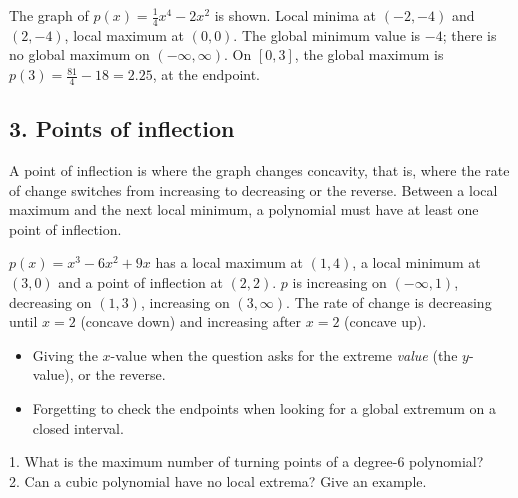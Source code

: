 \begin{example}
\begin{center}
\end{center}
The graph of $p(x)=\frac14x^4-2x^2$ is shown. \sol Local minima at $(-2,-4)$ and $(2,-4)$, local maximum at $(0,0)$. The global minimum value is $-4$; there is no global maximum on $(-\infty,\infty)$. On $[0,3]$, the global maximum is $p(3)=\frac{81}{4}-18=2.25$, at the endpoint.
\end{example}

\subsection*{3. Points of inflection}
A point of inflection is where the graph changes concavity, that is, where the rate of change switches from increasing to decreasing or the reverse. Between a local maximum and the next local minimum, a polynomial must have at least one point of inflection.

\begin{example}[Example 2]
$p(x)=x^3-6x^2+9x$ has a local maximum at $(1,4)$, a local minimum at $(3,0)$ and a point of inflection at $(2,2)$.
\sol $p$ is increasing on $(-\infty,1)$, decreasing on $(1,3)$, increasing on $(3,\infty)$. The rate of change is decreasing until $x=2$ (concave down) and increasing after $x=2$ (concave up).
\end{example}

\begin{mistakes}
\begin{itemize}
\item Giving the $x$-value when the question asks for the extreme \emph{value} (the $y$-value), or the reverse.
\item Forgetting to check the endpoints when looking for a global extremum on a closed interval.
\end{itemize}
\end{mistakes}

\begin{quickcheck}
1. What is the maximum number of turning points of a degree-6 polynomial?\\
2. Can a cubic polynomial have no local extrema? Give an example.
\end{quickcheck}

